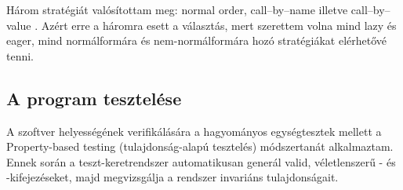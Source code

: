 \documentclass[a4paper,oneside,12pt]{article}
\begin{document}
Három stratégiát valósítottam meg: \foreignlanguage{english}{normal order}, \foreignlanguage{english}{call--by--name} illetve \foreignlanguage{english}{call--by--value} \cite{Lambdakalkulus2007}. Azért erre a háromra esett a választás, mert szerettem volna mind \foreignlanguage{english}{lazy} és \foreignlanguage{english}{eager}, mind normálformára és nem-normálformára hozó stratégiákat elérhetővé tenni.




\subsection{A program tesztelése}
\label{sec:a-teszt-orakulum-kialak}

A szoftver helyességének verifikálására a hagyományos egységtesztek mellett a \foreignlanguage{english}{Property-based testing} (tulajdonság-alapú tesztelés) módszertanát alkalmaztam. Ennek során a teszt-keretrendszer automatikusan generál valid, véletlenszerű \lam- és \ski-kifejezéseket, majd megvizsgálja a rendszer invariáns tulajdonságait.
\end{document}
